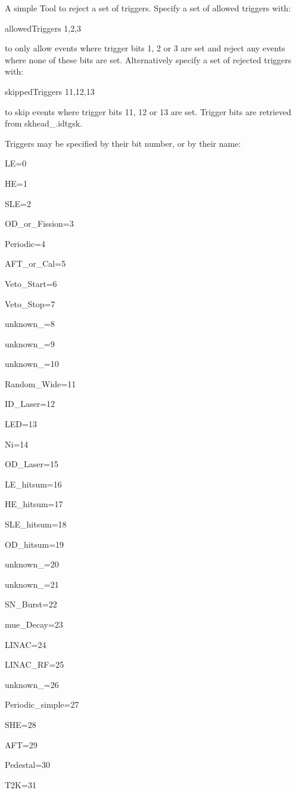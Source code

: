A simple Tool to reject a set of triggers. Specify a set of allowed triggers with\+: \begin{DoxyVerb}allowedTriggers 1,2,3
\end{DoxyVerb}
 to only allow events where trigger bits 1, 2 or 3 are set and reject any events where none of these bits are set. Alternatively specify a set of rejected triggers with\+: \begin{DoxyVerb}skippedTriggers 11,12,13
\end{DoxyVerb}
 to skip events where trigger bits 11, 12 or 13 are set. Trigger bits are retrieved from skhead\+\_\+.\+idtgsk.

Triggers may be specified by their bit number, or by their name\+:
\begin{DoxyItemize}
\item LE=0
\item HE=1
\item SLE=2
\item OD\+\_\+or\+\_\+\+Fission=3
\item Periodic=4
\item AFT\+\_\+or\+\_\+\+Cal=5
\item Veto\+\_\+\+Start=6
\item Veto\+\_\+\+Stop=7
\item unknown\+\_=8
\item unknown\+\_=9
\item unknown\+\_=10
\item Random\+\_\+\+Wide=11
\item ID\+\_\+\+Laser=12
\item LED=13
\item Ni=14
\item OD\+\_\+\+Laser=15
\item LE\+\_\+hitsum=16
\item HE\+\_\+hitsum=17
\item SLE\+\_\+hitsum=18
\item OD\+\_\+hitsum=19
\item unknown\+\_=20
\item unknown\+\_=21
\item SN\+\_\+\+Burst=22
\item mue\+\_\+\+Decay=23
\item LINAC=24
\item LINAC\+\_\+\+RF=25
\item unknown\+\_=26
\item Periodic\+\_\+simple=27
\item SHE=28
\item AFT=29
\item Pedestal=30
\item T2K=31
\end{DoxyItemize}

